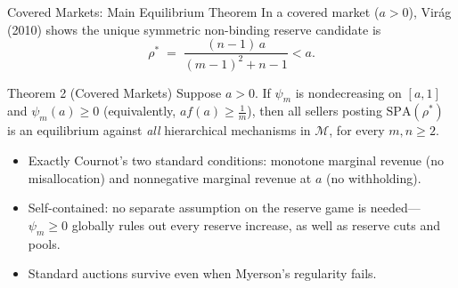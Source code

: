 \documentclass[11pt,aspectratio=169,handout]{beamer}
\def\meditem{\smallskip\item}
\newcommand{\SPA}{\mathrm{SPA}}
\begin{document}
\begin{frame}{Covered Markets: Main Equilibrium Theorem}
In a covered market ($a>0$), Vir\'ag (2010) shows the unique symmetric non-binding reserve candidate is
\[
\rho^* \;=\; \frac{(n-1)\,a}{(m-1)^2 + n - 1} < a.
\]

\medskip
\begin{block}{Theorem 2 (Covered Markets)}
Suppose $a>0$. If $\psi_m$ is nondecreasing on $[a,1]$ and $\psi_m(a)\ge 0$ (equivalently, $af(a)\ge\frac1m$), then all sellers posting $\SPA(\rho^*)$ is an equilibrium against \emph{all} hierarchical mechanisms in $\mathcal M$, for every $m,n\ge 2$.
\end{block}

\begin{itemize}
\item Exactly Cournot's two standard conditions: monotone marginal revenue (no misallocation) and nonnegative marginal revenue at $a$ (no withholding).
\meditem \alert{Self-contained}: no separate assumption on the reserve game is needed---$\psi_m\ge 0$ globally rules out every reserve increase, as well as reserve cuts and pools.
\meditem Standard auctions survive even when Myerson's regularity fails.
\end{itemize}
\end{frame}
\end{document}
